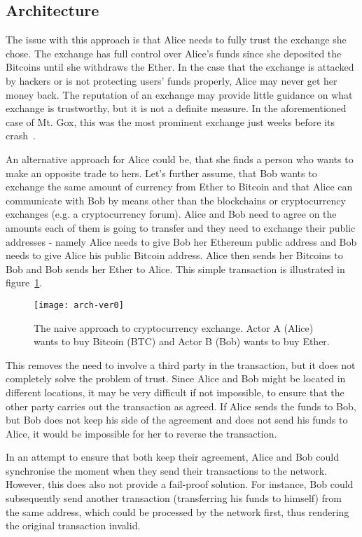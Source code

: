 \subsection{Architecture}
% 

The issue with this approach is that Alice needs to fully trust the exchange she chose. The exchange has full control over Alice's funds since she deposited the Bitcoins until she withdraws the Ether. In the case that the exchange is attacked by hackers or is not protecting users' funds properly, Alice may never get her money back. The reputation of an exchange may provide little guidance on what exchange is trustworthy, but it is not a definite measure. In the aforementioned case of Mt. Gox, this was the most prominent exchange just weeks before its crash~\cite{Popper2014ApparentTimes}.

An alternative approach for Alice could be, that she finds a person who wants to make an opposite trade to hers. Let's further assume, that Bob wants to exchange the same amount of currency from Ether to Bitcoin and that Alice can communicate with Bob by means other than the blockchains or cryptocurrency exchanges (e.g. a cryptocurrency forum). Alice and Bob need to agree on the amounts each of them is going to transfer and they need to exchange their public addresses - namely Alice needs to give Bob her Ethereum public address and Bob needs to give Alice his public Bitcoin address. Alice then sends her Bitcoins to Bob and Bob sends her Ether to Alice. This simple transaction is illustrated in figure~\ref{fig:arch-ver0}.

\begin{figure}[ht]
    \centering
    \texttt{[image: arch-ver0]}
    \caption{The naive approach to cryptocurrency exchange. Actor A (Alice) wants to buy Bitcoin (BTC) and Actor B (Bob) wants to buy Ether. }
    \label{fig:arch-ver0}
\end{figure}

This removes the need to involve a third party in the transaction, but it does not completely solve the problem of trust. Since Alice and Bob might be located in different locations, it may be very difficult if not impossible, to ensure that the other party carries out the transaction as agreed. If Alice sends the funds to Bob, but Bob does not keep his side of the agreement and does not send his funds to Alice, it would be impossible for her to reverse the transaction. 

In an attempt to ensure that both keep their agreement, Alice and Bob could synchronise the moment when they send their transactions to the network. However, this does also not provide a fail-proof solution. For instance, Bob could subsequently send another transaction (transferring his funds to himself) from the same address, which could be processed by the network first, thus rendering the original transaction invalid.

